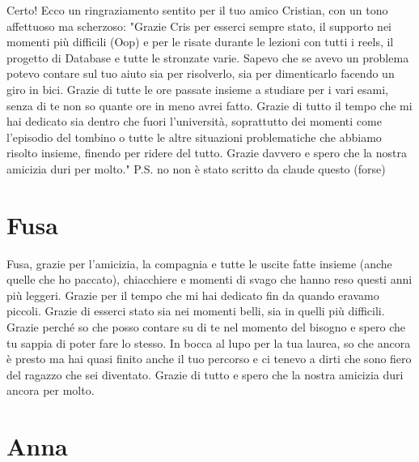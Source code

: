 \documentclass[12pt,a4paper,twoside]{report}
\begin{document}
Certo! Ecco un ringraziamento sentito per il tuo amico Cristian, con un tono affettuoso ma scherzoso:
"Grazie Cris per esserci sempre stato,  il supporto nei momenti più difficili (Oop) e per le risate durante le lezioni con tutti i reels, il progetto di Database e tutte le stronzate varie. 
\newline Sapevo che se avevo un problema potevo contare sul tuo aiuto sia per risolverlo, sia per dimenticarlo facendo un giro in bici. 
\newline Grazie di tutte le ore passate insieme a studiare per i vari esami, senza di te non so quante ore in meno avrei fatto. 
\newline Grazie di tutto il tempo che mi hai dedicato sia dentro che fuori l'università, soprattutto dei momenti come l'episodio del tombino o tutte le altre situazioni problematiche che abbiamo risolto insieme, finendo per ridere del tutto. 
\newline Grazie davvero e spero che la nostra amicizia duri per molto." 
\newline
P.S. no non è stato scritto da claude questo
\newline (forse)

\clearpage
\section*{Fusa}

Fusa, grazie per l'amicizia, la compagnia e tutte le uscite fatte insieme (anche quelle che ho paccato), chiacchiere e momenti di svago che hanno reso questi anni più leggeri. 
\newline Grazie per il tempo che mi hai dedicato fin da quando eravamo piccoli. 
\newline Grazie di esserci stato sia nei momenti belli, sia in quelli più difficili. 
\newline Grazie perché so che posso contare su di te nel momento del bisogno e spero che tu sappia di poter fare lo stesso. 
\newline In bocca al lupo per la tua laurea, so che ancora è presto ma hai quasi finito anche il tuo percorso e ci tenevo a dirti che sono fiero del ragazzo che sei diventato. 
\newline Grazie di tutto e spero che la nostra amicizia duri ancora per molto.

\clearpage
\section*{Anna}
\end{document}
